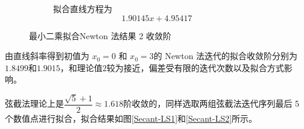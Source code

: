 \documentclass[11pt]{article}
\begin{document}
\begin{figure}[h]
\begin{subfigure}{.49\textwidth}
        \label{figure:Newton-LS2}
    \end{subfigure}
    \begin{subfigure}{.49\textwidth}
        \centering
        拟合直线方程为
        \begin{equation*}
            1.90145 x+4.95417
        \end{equation*}
    \end{subfigure}
    \caption{最小二乘拟合Newton 法结果 2 收敛阶}
    \label{Newton-LS2}
\end{figure}
由直线斜率得到初值为 $x_0 = 0$ 和 $x_0 = 3$的 Newton 法迭代的拟合收敛阶分别为$1.8499$和$1.9015$，和理论值$2$较为接近，偏差受有限的迭代次数以及拟合方式影响。

弦截法理论上是$\dfrac{\sqrt{5} + 1}{2} \approx 1.618$阶收敛的，同样选取两组弦截法迭代序列最后 5 个数值点进行拟合，拟合结果如图\ref{Secant-LS1}和\ref{Secant-LS2}所示。
\end{document}
